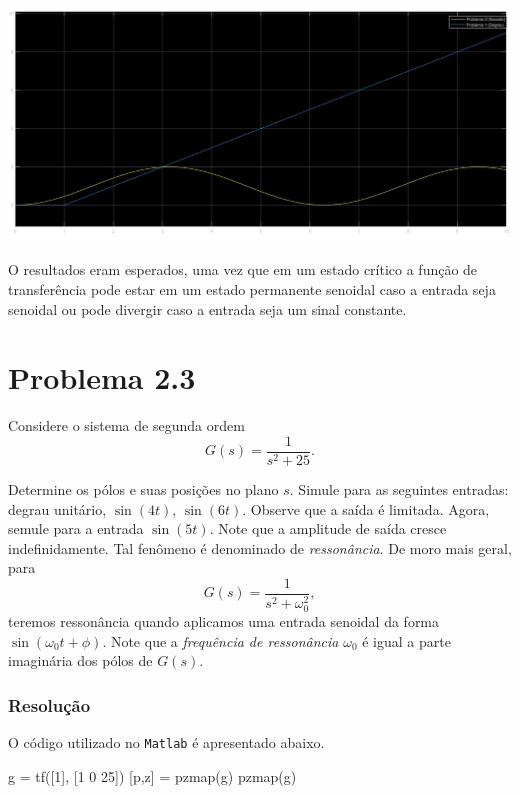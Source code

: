 \documentclass[
]{book}
\newenvironment{Shaded}{\begin{snugshade}}{\end{snugshade}}
\newcommand{\FloatTok}[1]{\textcolor[rgb]{0.00,0.00,0.81}{#1}}
\newcommand{\NormalTok}[1]{#1}
\theoremstyle{definition}
\theoremstyle{definition}
\theoremstyle{definition}
\theoremstyle{remark}
\begin{document}
\includegraphics{Imagens/Lab2/prob2B.jpg}

O resultados eram esperados, uma vez que em um estado crítico a função de transferência pode estar em um estado permanente senoidal caso a entrada seja senoidal ou pode divergir caso a entrada seja um sinal constante.

\hypertarget{problema-2.3}{%
\section*{Problema 2.3}\label{problema-2.3}}

Considere o sistema de segunda ordem
\[
G(s) = \frac {1}{s^2 +25}.
\]

Determine os pólos e suas posições no plano \(s\). Simule para as seguintes entradas: degrau unitário, \(\sin (4t)\), \(\sin(6t)\). Observe que a saída é limitada. Agora, semule para a entrada \(\sin(5t)\). Note que a amplitude de saída cresce indefinidamente. Tal fenômeno é denominado de \emph{ressonância}. De moro mais geral, para
\[
G(s) = \frac {1}{s^2+\omega_0^2},
\]
teremos ressonância quando aplicamos uma entrada senoidal da forma \(\sin(\omega_0t + \phi)\). Note que a \emph{frequência de ressonância} \(\omega_0\) é igual a parte imaginária dos pólos de \(G(s)\).

\hypertarget{resoluuxe7uxe3o-2}{%
\subsubsection*{Resolução}\label{resoluuxe7uxe3o-2}}

O código utilizado no \texttt{Matlab} é apresentado abaixo.

\begin{Shaded}
\begin{Highlighting}[]
\NormalTok{g = tf([}\FloatTok{1}\NormalTok{], [}\FloatTok{1} \FloatTok{0} \FloatTok{25}\NormalTok{])}
\NormalTok{[p,z] = pzmap(g)}
\NormalTok{pzmap(g)}
\end{Highlighting}
\end{Shaded}
\end{document}
